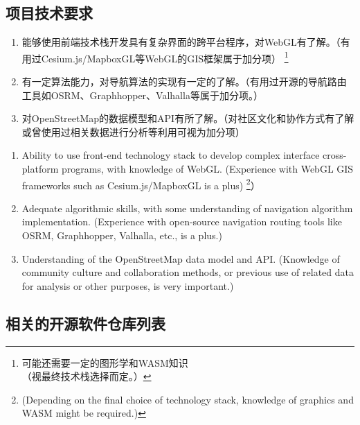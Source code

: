 \documentclass{beamer}
\begin{document}
\subsection{项目技术要求}

\begin{frame}
	\begin{enumerate}
		\item 能够使用前端技术栈开发具有复杂界面的跨平台程序，对WebGL有了解。（有用过Cesium.js/MapboxGL等WebGL的GIS框架属于加分项）
		      \footnote{可能还需要一定的图形学和WASM知识\\（视最终技术栈选择而定。）}
		\item 有一定算法能力，对导航算法的实现有一定的了解。（有用过开源的导航路由工具如OSRM、Graphhopper、Valhalla等属于加分项。）
		\item 对OpenStreetMap的数据模型和API有所了解。（对社区文化和协作方式有了解或曾使用过相关数据进行分析等利用可视为加分项）
	\end{enumerate}
\end{frame}

\begin{frame}
	\begin{enumerate}
		\item Ability to use front-end technology stack to develop complex interface cross-platform programs, with knowledge of WebGL. (Experience with WebGL GIS frameworks such as Cesium.js/MapboxGL is a plus)
		      \footnote{(Depending on the final choice of technology stack, knowledge of graphics and WASM might be required.)}）
		\item Adequate algorithmic skills, with some understanding of navigation algorithm implementation. (Experience with open-source navigation routing tools like OSRM, Graphhopper, Valhalla, etc., is a plus.)
		\item Understanding of the OpenStreetMap data model and API. (Knowledge of community culture and collaboration methods, or previous use of related data for analysis or other purposes, is very important.)
	\end{enumerate}
\end{frame}


\subsection{相关的开源软件仓库列表}
\end{document}
